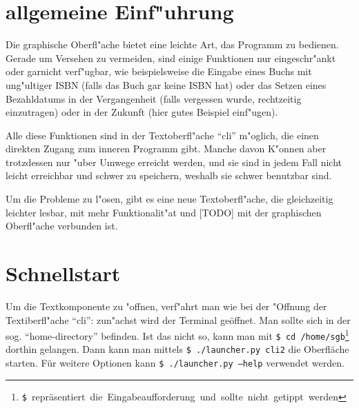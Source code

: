 


\newcommand{\command}[1]{\mbox{\texttt{#1}}}



\maketitle
\newpage

\tableofcontents
\newpage

\section{allgemeine Einf"uhrung}
\label{sec:general_intro}

Die graphische Oberfl"ache bietet eine leichte Art, das Programm zu bedienen.
Gerade um Versehen zu vermeiden, sind einige Funktionen nur eingeschr"ankt oder garnicht verf"ugbar, wie beispielsweise die Eingabe eines Buchs mit ung"ultiger ISBN (falls das Buch gar keine ISBN hat) oder das Setzen eines Bezahldatums in der Vergangenheit (falls vergessen wurde, rechtzeitig einzutragen) oder in der Zukunft (hier gutes Beispiel einf"ugen).

Alle diese Funktionen sind in der Textoberfl"ache ``cli'' m"oglich, die einen direkten Zugang zum inneren Programm gibt. Manche davon K"onnen aber trotzdessen nur "uber Umwege erreicht werden, und sie sind in jedem Fall nicht leicht erreichbar und schwer zu speichern, weshalb sie schwer benutzbar sind.

Um die Probleme zu l"osen, gibt es eine neue Textoberfl"ache, die gleichzeitig leichter lesbar, mit mehr Funktionalit"at und [TODO] mit der graphischen Oberfl"ache verbunden ist.

\section{Schnellstart}
\label{sec:quickstart}

Um die Textkomponente zu "offnen, verf"ahrt man wie bei der "Offnung der Textiberfl"ache ``cli'':
zun"achst wird der Terminal geöffnet. Man sollte sich in der sog. ``home-directory'' befinden. Ist das nicht so, kann man mit \mbox{\command{\$ cd /home/sgb}\footnote{\texttt{\$} repräsentiert die Eingabeaufforderung und sollte nicht getippt werden}} dorthin gelangen. Dann kann man mittels \command{\$ ./launcher.py cli2} die Oberfläche starten. Für weitere Optionen kann \command{\$ ./launcher.py --help} verwendet werden.



